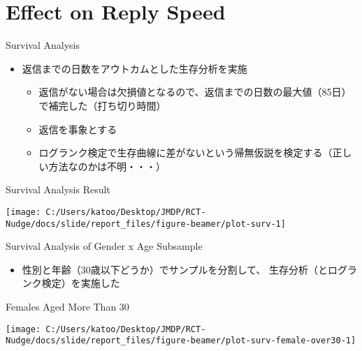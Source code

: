 \documentclass[
      aspectratio=169,
        12pt,
    ]{beamer}
\providecommand{\tightlist}{%
  \setlength{\itemsep}{0pt}\setlength{\parskip}{0pt}}
\begin{document}
\hypertarget{effect-on-reply-speed}{%
\section{Effect on Reply Speed}\label{effect-on-reply-speed}}

\begin{frame}{Survival Analysis}
\protect\hypertarget{survival-analysis}{}
\begin{itemize}
\tightlist
\item
  返信までの日数をアウトカムとした生存分析を実施

  \begin{itemize}
  \tightlist
  \item
    返信がない場合は欠損値となるので、返信までの日数の最大値（85日）で補完した（打ち切り時間）
  \item
    返信を事象とする
  \item
    ログランク検定で生存曲線に差がないという帰無仮説を検定する（正しい方法なのかは不明・・・）
  \end{itemize}
\end{itemize}
\end{frame}

\begin{frame}{Survival Analysis Result}
\protect\hypertarget{survival-analysis-result}{}
\begin{center}\texttt{[image: C:/Users/katoo/Desktop/JMDP/RCT-Nudge/docs/slide/report\_files/figure-beamer/plot-surv-1]} \end{center}
\end{frame}

\begin{frame}{Survival Analysis of Gender x Age Subsample}
\protect\hypertarget{survival-analysis-of-gender-x-age-subsample}{}
\begin{itemize}
\tightlist
\item
  性別と年齢（30歳以下どうか）でサンプルを分割して、
  生存分析（とログランク検定）を実施した
\end{itemize}
\end{frame}

\begin{frame}{Females Aged More Than 30}
\protect\hypertarget{females-aged-more-than-30}{}
\begin{center}\texttt{[image: C:/Users/katoo/Desktop/JMDP/RCT-Nudge/docs/slide/report\_files/figure-beamer/plot-surv-female-over30-1]} \end{center}
\end{frame}
\end{document}
